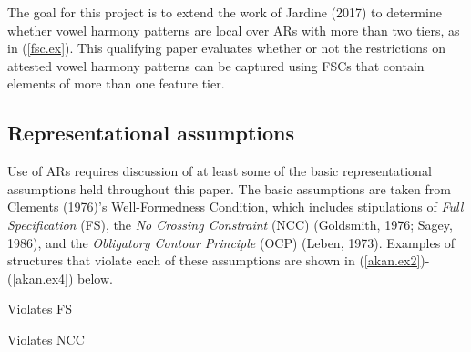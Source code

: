 \documentclass[,doc,floatsintext]{apa6}
\theoremstyle{definition}
\theoremstyle{definition}
\theoremstyle{definition}
\theoremstyle{remark}
\begin{document}
The goal for this project is to extend the work of Jardine (2017) to
determine whether vowel harmony patterns are local over ARs with more
than two tiers, as in (\ref{fsc.ex}). This qualifying paper evaluates
whether or not the restrictions on attested vowel harmony patterns can
be captured using FSCs that contain elements of more than one feature
tier.

\subsection{Representational
assumptions}\label{representational-assumptions}

Use of ARs requires discussion of at least some of the basic
representational assumptions held throughout this paper. The basic
assumptions are taken from Clements (1976)'s Well-Formedness Condition,
which includes stipulations of \emph{Full Specification} (FS), the
\emph{No Crossing Constraint} (NCC) (Goldsmith, 1976; Sagey, 1986), and
the \emph{Obligatory Contour Principle} (OCP) (Leben, 1973). Examples of
structures that violate each of these assumptions are shown in
(\ref{akan.ex2})-(\ref{akan.ex4}) below.

\begin{exe}
\ex \label{akan.ex2} Violates FS
\end{exe}

\begin{exe}
\ex \label{akan.ex3} Violates NCC
\end{exe}
\end{document}
